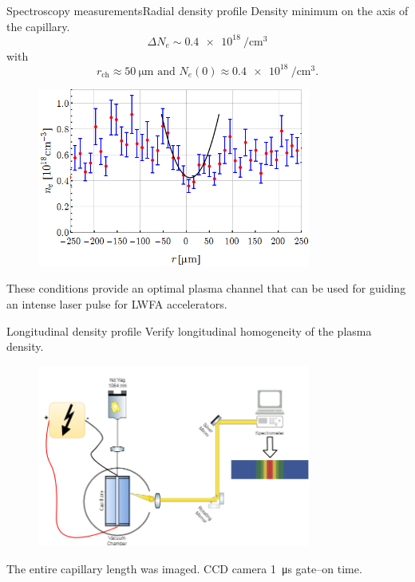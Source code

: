 \documentclass[]{beamer}
\begin{document}
  \begin{frame}{Spectroscopy measurements}{Radial density profile}
    Density minimum on the axis of the capillary.
    \begin{equation*}
      \Delta N_e \sim \SI{0.4e18}{\per \cubic \cm}
    \end{equation*}
    with
    \begin{equation*}
      r_\text{ch}\approx \SI{50}{\um} \text{ and } N_e\left(0\right)\approx \SI{0.4e18}{\per\cubic\cm}.
    \end{equation*}
    \begin{figure}
      \includegraphics[width=0.8\textwidth]{figures/results/spectro/parabolic_profile.png}
    \end{figure}
    These conditions provide an optimal plasma channel that can be used for guiding an intense laser pulse for LWFA accelerators.
  \end{frame}
  \begin{frame}{Longitudinal density profile}
    Verify longitudinal homogeneity of the plasma density.
    \begin{figure}
      \includegraphics[width=0.8\textwidth]{figures/results/spectro/longitudinal_system.png}
    \end{figure}
    The entire capillary length was imaged.
    CCD camera \SI{1}{\us} gate--on time.
  \end{frame}
\end{document}
